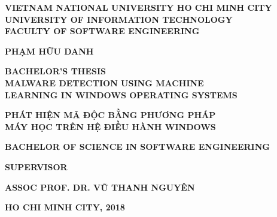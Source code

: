 \begin{titlepage}
\begin{center}
  
\textbf{\large VIETNAM NATIONAL UNIVERSITY HO CHI MINH CITY} \\[2mm]
\textbf{\Large UNIVERSITY OF INFORMATION TECHNOLOGY} \\ [2mm]
\textbf{\Large FACULTY OF SOFTWARE ENGINEERING}

\vspace{0.07\textheight}
\begin{otherlanguage}{vietnamese}
\textbf{\large PHẠM HỮU DANH}
\end{otherlanguage}

\vspace{0.1\textheight}
\textbf{\Large BACHELOR’S THESIS} \\ [10mm]

\textbf{\Large MALWARE DETECTION USING MACHINE } \\ [2mm]
\textbf{\Large LEARNING IN WINDOWS OPERATING SYSTEMS} \\ [10mm]
\begin{otherlanguage}{vietnamese}
\textbf{ \Large PHÁT HIỆN MÃ ĐỘC BẰNG PHƯƠNG PHÁP} \\ [2mm]
\textbf{ \Large MÁY HỌC TRÊN HỆ ĐIỀU HÀNH WINDOWS}
\end{otherlanguage}

\vspace{0.1\textheight}
\textbf{\large BACHELOR OF SCIENCE IN SOFTWARE ENGINEERING} 

\vspace{0.07\textheight}
\textbf{\large SUPERVISOR} \\ [2mm]
\begin{otherlanguage}{vietnamese}
\textbf{\large ASSOC PROF. DR. VŨ THANH NGUYÊN}
\end{otherlanguage}


\vspace{\fill}
\textbf{\large HO CHI MINH CITY, 2018}

\end{center}
\end{titlepage}
\cleardoublepage

